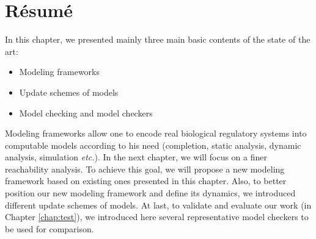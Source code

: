 \section{R\'esum\'e}
In this chapter, we presented mainly three main basic contents of the state of the art:

\begin{itemize}
    \item Modeling frameworks
    \item Update schemes of models
    \item Model checking and model checkers
\end{itemize}

Modeling frameworks allow one to encode real biological regulatory systems into computable models according to his need (completion, static analysis, dynamic analysis, simulation \textit{etc.}).
In the next chapter, we will focus on a finer reachability analysis.
To achieve this goal, we will propose a new modeling framework based on existing ones presented in this chapter.
Also, to better position our new modeling framework and define its dynamics, we introduced different update schemes of models.
At last, to validate and evaluate our work (in Chapter \ref{chap:test}), we introduced here several representative model checkers to be used for comparison.